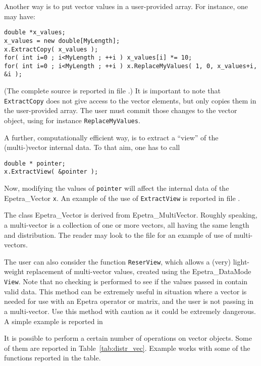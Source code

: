 Another way is to put vector values in a user-provided array. For
instance, one may have:
\begin{verbatim}
double *x_values;
x_values = new double[MyLength];
x.ExtractCopy( x_values );
for( int i=0 ; i<MyLength ; ++i ) x_values[i] *= 10;
for( int i=0 ; i<MyLength ; ++i ) x.ReplaceMyValues( 1, 0, x_values+i, &i );
\end{verbatim}
(The complete source is reported in file .)  It is
important to note that \verb!ExtractCopy! does not give access to the
vector elements, but only copies them in the user-provided array.  The
user must commit those changes to the vector object, using for instance
\verb!ReplaceMyValues!.

A further, computationally efficient way, is to extract a ``view'' of the
(multi-)vector internal data.  To that aim, one has to call
\begin{verbatim}
double * pointer;
x.ExtractView( &pointer );
\end{verbatim}
Now, modifying the values of \verb!pointer! will affect the internal
data of the Epetra\_Vector \verb!x!.  An example of the use of
\verb!ExtractView! is reported in file .

\begin{remark}
  The class Epetra\_Vector is derived from Epetra\_MultiVector. Roughly
  speaking, a multi-vector is a collection of one or more vectors, all
  having the same length and distribution. The reader may look to the
  file  for an example of use of multi-vectors.
\end{remark}

The user can also consider the function \verb!ReserView!, which allows a
(very) light-weight replacement of multi-vector values, created using
the Epetra\_DataMode \verb!View!. Note that no checking is performed to
see if the values passed in contain valid data. This method can be
extremely useful in situation where a vector is needed for use with an
Epetra operator or matrix, and the user is not passing in a
multi-vector. Use this method with caution as it could be extremely
dangerous.
A simple example is reported in 

\medskip

It is possible to perform a certain number of operations on vector
objects. Some of them are reported in Table~\ref{tab:distr_vec}.
Example  works with some of the functions reported in
the table.

